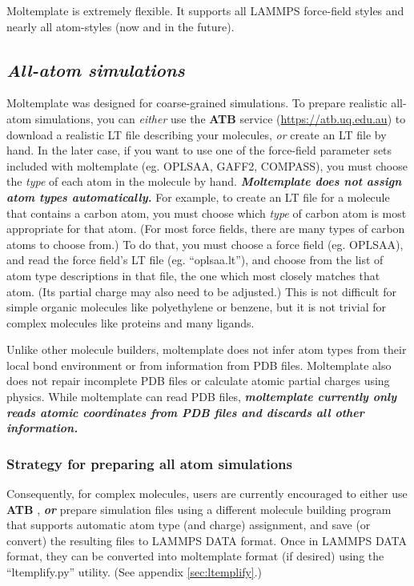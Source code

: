 \documentclass[11pt]{article}
\begin{document}
Moltemplate is extremely flexible.
It supports all LAMMPS force-field styles and nearly all atom-styles
(now and in the future).

\subsection*{\textit{All-atom simulations}}
\label{sec:all_atom_limitations}
Moltemplate was designed for coarse-grained simulations.
To prepare realistic all-atom simulations,
you can \textit{either} use the \textbf{ATB} service
(\url{https://atb.uq.edu.au}) to download a realistic LT file describing
your molecules, \textit{or} create an LT file by hand.
In the later case, if you want to use one of the force-field parameter
sets included with moltemplate (eg. OPLSAA, GAFF2, COMPASS),
you must choose the \textit{type} of each atom in the molecule by hand.
\textit{\textbf{Moltemplate does not assign atom types automatically.}}
For example, to create an LT file for a molecule that contains
a carbon atom, you must choose which \textit{type} of carbon
atom is most appropriate for that atom.
(For most force fields, there are many types of carbon atoms to choose from.)
To do that, you must choose a force field (eg. OPLSAA), and read the
force field's LT file (eg. ``oplsaa.lt''), and choose from the list of atom
type descriptions in that file, the one which most closely matches that atom.
(Its partial charge may also need to be adjusted.)
This is not difficult for simple organic molecules like polyethylene or benzene,
but it is not trivial for complex molecules like proteins and many ligands.

Unlike other molecule builders, moltemplate does not infer atom types
from their local bond environment or from information from PDB files.
Moltemplate also does not repair incomplete PDB files or calculate
atomic partial charges using physics.  While moltemplate can read PDB files, 
\textit{\textbf{moltemplate currently only reads atomic coordinates from PDB
files and discards all other information.}}

\subsubsection*{Strategy for preparing all atom simulations}
Consequently, for complex molecules, users are currently
encouraged to either use \textbf{ATB} \cite{ATB},
\textit{\textbf{or}} prepare simulation files using a different
molecule building program that supports automatic atom type (and charge)
assignment, and save (or convert) the resulting files to LAMMPS DATA format.
Once in LAMMPS DATA format, they can be converted into moltemplate format
(if desired) using the ``ltemplify.py'' utility.
(See appendix \ref{sec:ltemplify}.)
\end{document}
